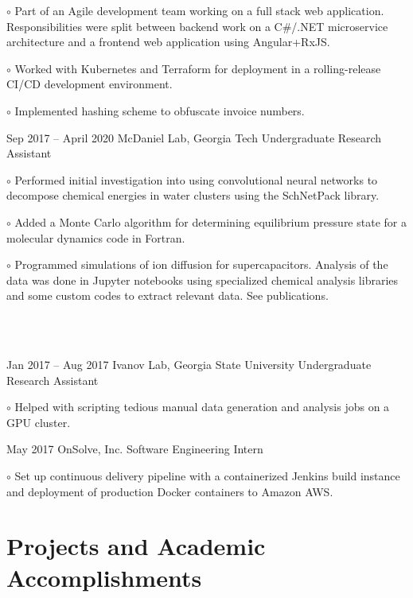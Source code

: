 \documentclass[fontsize=11pt]{tccv}
\begin{document}
\begin{eventlist}
    { \setlength\parindent{24pt}
         $\circ$ Part of an Agile development team working on a full stack web application. Responsibilities were split between backend work on a C\#/.NET microservice architecture and a frontend web application using Angular+RxJS.
         
         $\circ$ Worked with Kubernetes and Terraform for deployment in a rolling-release CI/CD development environment.
         
         $\circ$ Implemented hashing scheme to obfuscate invoice numbers.
     }
     
\item{Sep 2017 -- April 2020}
     {McDaniel Lab, Georgia Tech}
     {Undergraduate Research Assistant}

    { \setlength\parindent{24pt}
        $\circ$ Performed initial investigation into using convolutional neural networks to decompose chemical energies in water clusters using the SchNetPack library.

        $\circ$ Added a Monte Carlo algorithm for determining equilibrium pressure state for a molecular dynamics code in Fortran.

        $\circ$ Programmed simulations of ion diffusion for supercapacitors. Analysis of the data was done in Jupyter notebooks using specialized chemical analysis libraries and some custom codes to extract relevant data. See publications.
    }
    \\
    \\

\item{Jan 2017 -- Aug 2017}
     {Ivanov Lab, Georgia State University}
     {Undergraduate Research Assistant}

    { \setlength\parindent{24pt}
        $\circ$ Helped with scripting tedious manual data generation and analysis jobs on a GPU cluster.
    }
    
\item{May 2017}
     {OnSolve, Inc.}
     {Software Engineering Intern}

    { \setlength\parindent{24pt}
        $\circ$ Set up continuous delivery pipeline with a containerized Jenkins build instance and deployment of production Docker containers to Amazon AWS.
    }
    
\end{eventlist}

\section{Projects and Academic Accomplishments}
\end{document}

